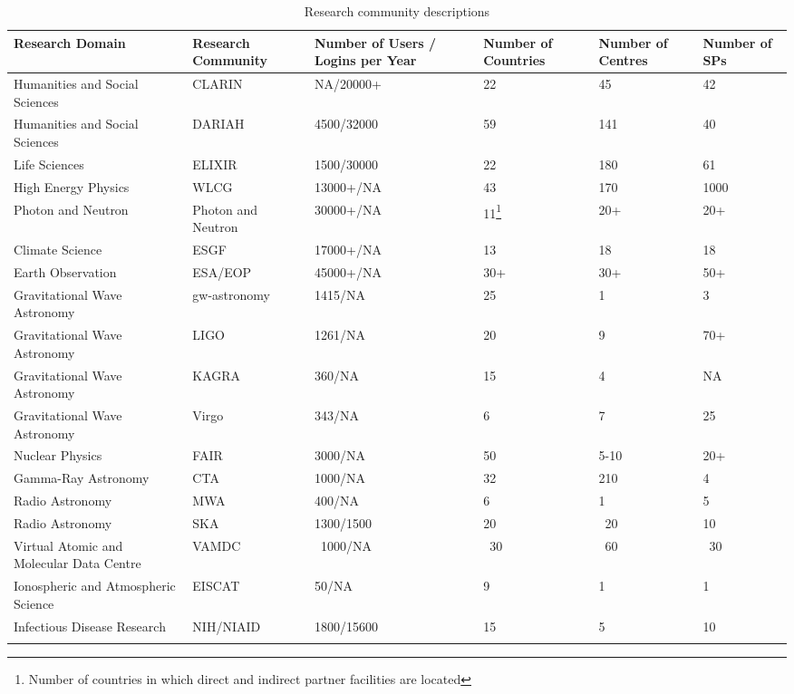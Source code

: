\documentclass[fleqn,10pt]{wlscirep}
\begin{document}
{\begin{center}
\begin{longtable}{|p{5cm}|*{5}{p{}|}} 
\hline
Research Domain & Research Community & Number of Users / Logins per Year & Number of Countries & Number of Centres & Number of SPs \\
\hline \hline
\endhead
\hline
Humanities and Social Sciences & CLARIN & NA/20000+ & 22 & 45 & 42 \\
\hline
Humanities and Social Sciences & DARIAH & 4500/32000 & 59 & 141 & 40\\
\hline
Life Sciences& ELIXIR&1500/30000&22&180&61\\
\hline
High Energy Physics&WLCG&13000+/NA&43&170&1000\\
\hline
Photon and Neutron&Photon and Neutron&30000+/NA&11\footnote{Number of countries in which direct and indirect partner facilities are located}&20+&20+\\
\hline
Climate Science&ESGF& 17000+/NA&13&18&18\\
\hline
Earth Observation&ESA/EOP&45000+/NA&30+&30+&50+\\
\hline
Gravitational Wave Astronomy&gw-astronomy&1415/NA&25&1&3\\
\hline
Gravitational Wave Astronomy&LIGO&1261/NA&20&9&70+\\
\hline
Gravitational Wave Astronomy&KAGRA&360/NA&15&4&NA\\
\hline
Gravitational Wave Astronomy&Virgo&343/NA&6&7&25\\
\hline
Nuclear Physics&FAIR&3000/NA&50&5-10&20+\\
\hline
Gamma-Ray Astronomy&CTA& 1000/NA&32&210&4\\
\hline
Radio Astronomy&MWA&400/NA&6&1&5\\
\hline
Radio Astronomy&SKA&1300/1500&20&~20&10\\
\hline
Virtual Atomic and Molecular Data Centre&VAMDC&~1000/NA&~30&~60&~30\\
\hline
Ionospheric and Atmospheric Science&EISCAT&50/NA&9&1&1\\
\hline
Infectious Disease Research&NIH/NIAID&1800/15600&15&5&10\\
\hline
\caption{Research community descriptions}
\label{tab:table1}
\end{longtable}
\end{center}

}
\end{document}
